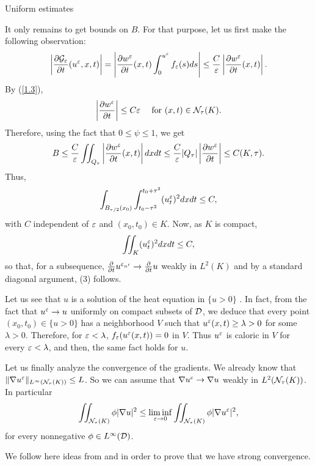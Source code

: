 \begin{section}{Uniform estimates}
\begin{pf}
It only remains to get bounds on $B$. For that purpose, let us first make the 
following observation:
$$\left|\frac{\partial {\cal G}_{\varepsilon}}{\partial t}(u^{\varepsilon},x,t)\right|=
\left|\frac{\partial w^{\varepsilon}}{\partial t}(x,t)
\int_{0}^{u^{\varepsilon}}f_{\varepsilon}(s) ds\right|
\leq \frac{C}{\varepsilon}\left|\frac{\partial w^{\varepsilon}}{\partial t}(x,t)\right|.$$
By (\ref{1.3}), 
$$\left| \frac{\partial w^{\varepsilon}}{\partial t}\right|\le C\varepsilon 
\quad  \mbox{ for } (x,t)\in{\cal N}_{\tau}(K).$$
Therefore, using the fact that $0\leq \psi \leq 1$, we get
$$B\leq \frac{C}{\varepsilon}\iint_{Q_{\tau}}\left|\frac{\partial w^{\varepsilon}}
{\partial t}(x,t)\right| dx dt  \le \frac C{\varepsilon}|Q_\tau|
\left| \frac{\partial w^{\varepsilon}}{\partial t}\right|\leq  C(K,\tau).$$
Thus, 
$$\int_{B_{\tau/2}(x_0)}\int_{t_0-\tau^2}^{t_0+\tau^2} (u^{\varepsilon}_t)^2 dxdt
\le C,$$ 
with $C$ independent of $\varepsilon$ and $(x_0,t_0)\in K$. Now, as $K$ is compact, 
$$\iint_{K}(u^{\varepsilon}_t)^2 dxdt\le C,$$
so that, for a subsequence, $\frac{\partial}{\partial t}u^{\varepsilon_{n^\prime}}
\to \frac{\partial}{\partial t}u$ weakly in $L^2(K)$ and by a standard 
diagonal argument, (3) follows.

Let us see that $u$ is a solution of the heat equation in $\{ u>0\}$ .
In fact, from the fact that $u^{\varepsilon}\to u$ uniformly on compact subsets of 
${\cal D}$, we deduce that every point $(x_0,t_0)\in\{ u>0\}$ has a 
neighborhood $V$ such that $u^{\varepsilon}(x,t)\ge\lambda>0$ for some $\lambda>0$. 
Therefore, for $\varepsilon<\lambda$, $f_{\varepsilon}(u^{\varepsilon}(x,t))=0$ in $V$. Thus 
$u^{\varepsilon}$ is caloric in $V$ for every $\varepsilon<\lambda$, and then, the same fact 
holds for $u$.

Let us finally analyze the convergence of the gradients. We already know that 
\linebreak $\|\nabla u^{\varepsilon}\|_{L^{\infty}({\cal N}_{\tau}(K))}\le L$. So we can assume 
that $\nabla u^{\varepsilon}\to \nabla u$ weakly in $L^{2}({\cal N}_{\tau}(K))$. 
In particular
$$\iint_{{\cal N}_{\tau}(K)}\phi |\nabla u|^2\le 
\liminf_{\varepsilon\to0}\iint_{{\cal N}_{\tau}(K)}\phi |\nabla u^{\varepsilon}|^2,$$
for every nonnegative $\phi\in L^{\infty}({\cal D})$.

We follow here ideas from \cite{BCN} and \cite{CV} in order to prove that we 
have strong convergence.


\end{pf}
\end{section}
